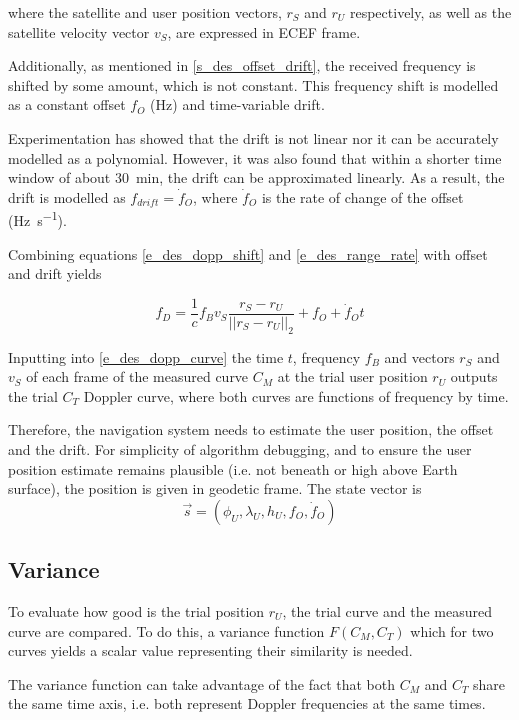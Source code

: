 where the satellite and user position vectors, $r_S$ and $r_U$ respectively, as well as the satellite velocity vector $v_S$, are expressed in ECEF frame.

Additionally, as mentioned in \autoref{s_des_offset_drift}, the received frequency is shifted by some amount, which is not constant. This frequency shift is modelled as a constant offset $f_O$ (Hz) and time-variable drift.

Experimentation has showed that the drift is not linear nor it can be accurately modelled as a polynomial. However, it was also found that within a shorter time window of about \qty{30}{min}, the drift can be approximated linearly. As a result, the drift is modelled as $f_{drift} = \dot f_O$, where $\dot f_O$ is the rate of change of the offset (\unit{\hertz\per\s}).

Combining equations \ref{e_des_dopp_shift} and \ref{e_des_range_rate} with offset and drift yields


\begin{equation}
    \label{e_des_dopp_curve}
    f_D = \frac{1}{c} f_B v_S \frac{r_S - r_U}{||r_S - r_U||_2} + f_O + \dot f_O t
\end{equation}

Inputting into \autoref{e_des_dopp_curve} the time $t$, frequency $f_B$ and vectors $r_S$ and $v_S$ of each frame of the measured curve $C_M$ at the trial user position $r_U$ outputs the trial $C_T$ Doppler curve, where both curves are functions of frequency by time.  %

Therefore, the navigation system needs to estimate the user position, the offset and the drift. For simplicity of algorithm debugging, and to ensure the user position estimate remains plausible (i.e. not beneath or high above Earth surface), the position is given in geodetic frame. The state vector is
\begin{equation*}
    \Vec{s} = (\phi_U, \lambda_U, h_U, f_O, \dot f_O)
\end{equation*}

\subsection{Variance}
To evaluate how good is the trial position $r_U$, the trial curve and the measured curve are compared. To do this, a variance function $F(C_M, C_T)$ which for two curves yields a scalar value representing their similarity is needed.

The variance function can take advantage of the fact that both $C_M$ and $C_T$ share the same time axis, i.e. both represent Doppler frequencies at the same times.

